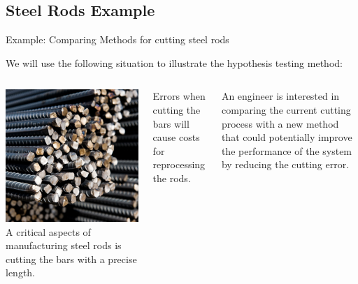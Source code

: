 \subsection{Steel Rods Example}
\begin{frame}[t]{Example: Comparing Methods for cutting steel rods}

  \begin{block}{}
  We will use the following situation to illustrate the hypothesis testing method:
  \end{block}

  \begin{columns}[T]
    \includegraphics[width=\textwidth]{../img/steelrods}
    A critical aspects of manufacturing steel rods is cutting the bars with a precise length. \bigskip

    Errors when cutting the bars will cause costs for reprocessing the rods.\bigskip

    An engineer is interested in comparing the current cutting process with a new method that could potentially improve the performance of the system by reducing the cutting error.
  \end{columns}
  \bigskip
\end{frame}

